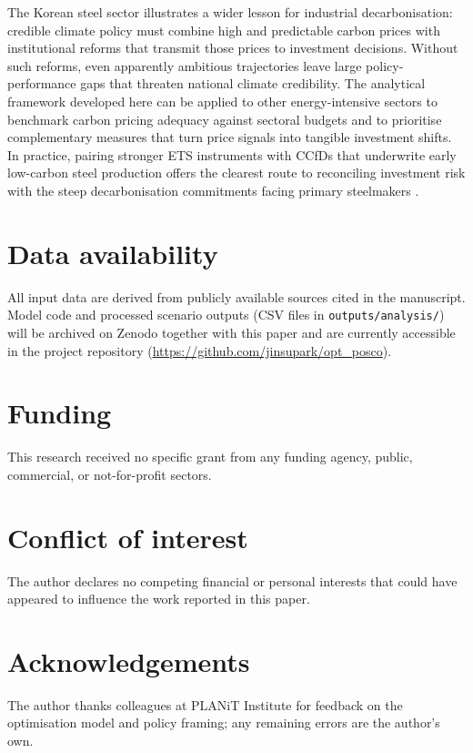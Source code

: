 \documentclass[preprint,1p,authoryear]{elsarticle}
\begin{document}
The Korean steel sector illustrates a wider lesson for industrial decarbonisation: credible climate policy must combine high and predictable carbon prices with institutional reforms that transmit those prices to investment decisions. Without such reforms, even apparently ambitious trajectories leave large policy-performance gaps that threaten national climate credibility. The analytical framework developed here can be applied to other energy-intensive sectors to benchmark carbon pricing adequacy against sectoral budgets and to prioritise complementary measures that turn price signals into tangible investment shifts. In practice, pairing stronger ETS instruments with CCfDs that underwrite early low-carbon steel production offers the clearest route to reconciling investment risk with the steep decarbonisation commitments facing primary steelmakers \citep{Neuhoff2019CCfD}.








\section*{Data availability}
All input data are derived from publicly available sources cited in the manuscript. Model code and processed scenario outputs (CSV files in \texttt{outputs/analysis/}) will be archived on Zenodo together with this paper and are currently accessible in the project repository (\url{https://github.com/jinsupark/opt\_posco}).

\section*{Funding}
This research received no specific grant from any funding agency, public, commercial, or not-for-profit sectors.

\section*{Conflict of interest}
The author declares no competing financial or personal interests that could have appeared to influence the work reported in this paper.

\section*{Acknowledgements}
The author thanks colleagues at PLANiT Institute for feedback on the optimisation model and policy framing; any remaining errors are the author’s own.
\end{document}
